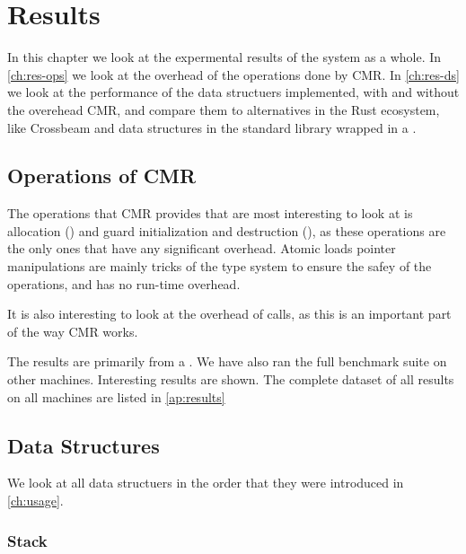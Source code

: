 \chapter{Results}

In this chapter we look at the expermental results of the system as a whole. In \cref{ch:res-ops}
we look at the overhead of the operations done by CMR. In \cref{ch:res-ds} we look at the
performance of the data structuers implemented, with and without the overehead CMR, and compare
them to alternatives in the Rust ecosystem, like Crossbeam\cite{crossbeam} and data structures in
the standard library wrapped in a .

\section{Operations of CMR\label{ch:res-ops}}

The operations that CMR provides that are most interesting to look at is allocation
() and guard initialization and destruction (), as these operations
are the only ones that have any significant overhead. Atomic loads pointer manipulations are mainly
tricks of the type system to ensure the safey of the operations, and has no run-time overhead.

It is also interesting to look at the overhead of  calls, as this is an important part
of the way CMR works.


The results are primarily from a . We have also ran the
full benchmark suite on other machines.
Interesting results are shown. The complete dataset of all results on all machines are listed in
\cref{ap:results}


\section{Data Structures\label{ch:res-ds}}

We look at all data structuers in the order that they were introduced in \cref{ch:usage}.


\clearpage
\subsection{Stack\label{sec:res-stack}}

